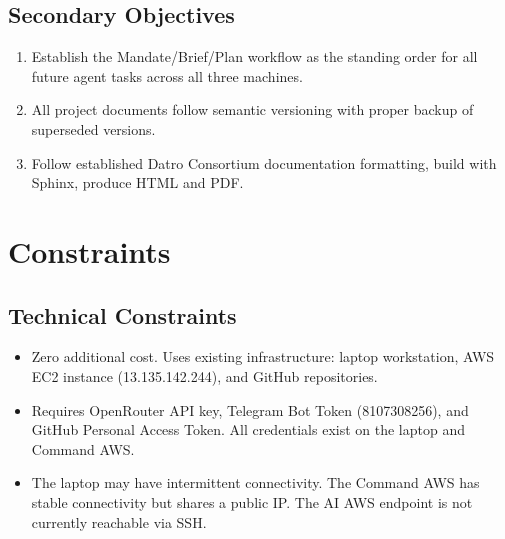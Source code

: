 \documentclass[letterpaper,10pt,openany,oneside,english]{sphinxmanual}
\begin{document}
\subsection{Secondary Objectives}
\label{\detokenize{objectives:secondary-objectives}}\begin{enumerate}
%
\setcounter{enumi}{7}
\item {} 
\sphinxAtStartPar
{} \textendash{} Establish the Mandate/Brief/Plan workflow as the standing order for all future agent tasks across all three machines.

\item {} 
\sphinxAtStartPar
{} \textendash{} All project documents follow semantic versioning with proper backup of superseded versions.

\item {} 
\sphinxAtStartPar
{} \textendash{} Follow established Datro Consortium documentation formatting, build with Sphinx, produce HTML and PDF.

\end{enumerate}

\sphinxstepscope


\section{Constraints}
\label{\detokenize{constraints:constraints}}\label{\detokenize{constraints::doc}}

\subsection{Technical Constraints}
\label{\detokenize{constraints:technical-constraints}}\begin{itemize}
\item {} 
\sphinxAtStartPar
{} \textendash{} Zero additional cost. Uses existing infrastructure: laptop workstation, AWS EC2 instance (13.135.142.244), and GitHub repositories.

\item {} 
\sphinxAtStartPar
{} \textendash{} Requires OpenRouter API key, Telegram Bot Token (8107308256), and GitHub Personal Access Token. All credentials exist on the laptop and Command AWS.

\item {} 
\sphinxAtStartPar
{} \textendash{} The laptop may have intermittent connectivity. The Command AWS has stable connectivity but shares a public IP. The AI AWS endpoint is not currently reachable via SSH.

\end{itemize}
\end{document}
